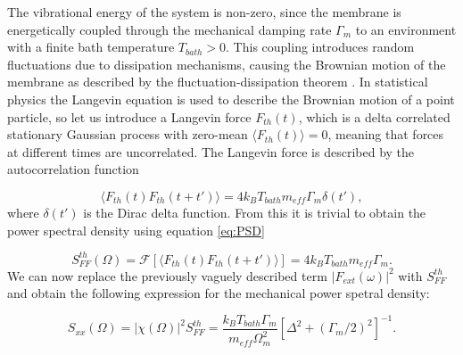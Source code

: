 The vibrational energy of the system is non-zero, since the membrane is energetically coupled through the mechanical damping rate $\Gamma_m$ to an environment with a finite bath temperature $T_{bath} > 0$. This coupling introduces random fluctuations due to dissipation mechanisms, causing the Brownian motion of the membrane as described by the fluctuation-dissipation theorem \cite{saulson1990}. In statistical physics the Langevin equation is used to describe the Brownian motion of a point particle, so let us introduce a Langevin force $F_{th}(t)$, which is a delta correlated stationary Gaussian process with zero-mean $\langle F_{th}(t) \rangle = 0$, meaning that forces at different times are uncorrelated. The Langevin force is described by the autocorrelation function

\begin{equation}
\langle F_{th}(t) F_{th}(t + t') \rangle = 4k_BT_{bath}m_{eff}\Gamma_m\delta(t'),
\label{eq:thermal_drive}
\end{equation}
\noindent
where $\delta(t')$ is the Dirac delta function. From this it is trivial to obtain the power spectral density using equation \eqref{eq:PSD}

\begin{equation}
S_{FF}^{th}(\Omega) = \mathcal{F}[\langle F_{th}(t) F_{th}(t + t') \rangle] = 4k_BT_{bath}m_{eff}\Gamma_m.
\end{equation}
\noindent
We can now replace the previously vaguely described term $\left|F_{ext}(\omega)\right|^2$ with $S_{FF}^{th}$ and obtain the following expression for the mechanical power spetral density:

\begin{equation}
S_{xx}(\Omega) = \left|\chi(\Omega)\right|^2S_{FF}^{th} = \frac{k_BT_{bath}\Gamma_m}{m_{eff}\Omega_{m}^2}\left[ \Delta^2 + (\Gamma_m/2)^2 \right]^{-1}.
\label{eq:full_psd}
\end{equation}
